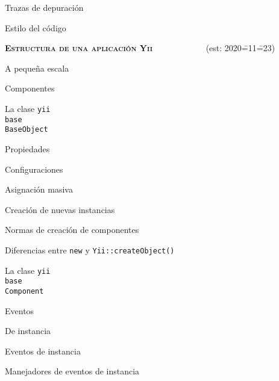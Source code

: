 \begin{longenum}
\begin{longenum}
\begin{longenum}
            \item Trazas de depuración
        \end{longenum}
        \item Estilo del código
    \end{longenum}
    \item \textbf{\textsc{Estructura de una aplicación Yii}} \ \ \ \ \ \ \ \ \ \ \ \ (est: 2020\==11\==23)
    \begin{longenum}
        \item A pequeña escala
        \begin{longenum}
            \item Componentes
            \begin{longenum}
                \item La clase \texttt{yii\\base\\BaseObject}
                \begin{longenum}
                    \item Propiedades
                    \item Configuraciones
                    \begin{longenum}
                        \item Asignación masiva
                        \item Creación de nuevas instancias
                        \item Normas de creación de componentes
                        \item Diferencias entre \texttt{new} y \texttt{Yii::createObject()}
                    \end{longenum}
                \end{longenum}
                \item La clase \texttt{yii\\base\\Component}
                \begin{longenum}
                    \item Eventos
                    \begin{longenum}
                        \item De instancia
                        \begin{longenum}
                            \item Eventos de instancia
                            \item Manejadores de eventos de instancia

\end{longenum}
\end{longenum}
\end{longenum}
\end{longenum}
\end{longenum}
\end{longenum}
\end{longenum}
